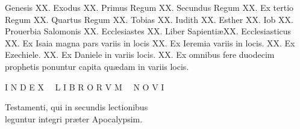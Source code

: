 \documentclass[a5paper,10pt]{book}
\def\ae{æ}
\begin{document}
\begin{multicols}{2}
\par \noindent Genesis \hfill XX.
\newline Exodus \hfill XX.
\newline Primus Regum \hfill XX.
\newline Secundus Regum \hfill XX.
\newline Ex tertio Regum \hfill XX.
\newline Quartus Regum \hfill XX.
\newline Tobias \hfill XX.
\newline Iudith \hfill XX.
\newline Esther \hfill XX.
\newline Iob \hfill XX.
\newline Prouerbia Salomonis \hfill XX.
\newline Ecclesiastes \hfill XX.
\newline Liber Sapienti\ae \hfill XX.
\newline Ecclesiasticus \hfill XX.
\newline Ex Isaia magna pars variis in
\newline \indent locis \hfill XX.
\newline Ex Ieremia variis in locis. \hfill XX.
\newline Ex Ezechiele. \hfill XX.
\newline Ex Daniele in variis locis. \hfill XX.
\newline Ex omnibus fere duodecim
\newline \indent prophetis ponuntur capita
\newline \indent qu\ae dam in variis locis. %
\end{multicols}
\vspace{+1em}

\begin{center} \color{red} \Large
I N D E X \ \ L I B R O R V M \ \ N O V I
\end{center}
\vspace{-1.5em}

\begin{center} \large
Testamenti, qui in secundis lectionibus\\
leguntur integri pr\ae ter Apocalypsim.
\end{center}
\end{document}
